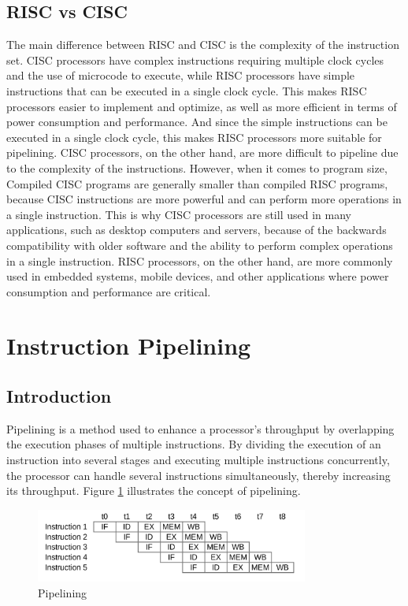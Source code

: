 \subsection{RISC vs CISC}
The main difference between RISC and CISC is the complexity of the instruction set. CISC processors have complex instructions requiring multiple clock cycles and the use of microcode to execute, while RISC processors have simple instructions that can be executed in a single clock cycle\cite{jamil1995risc}. This makes RISC processors easier to implement and optimize, as well as more efficient in terms of power consumption and performance. And since the simple instructions can be executed in a single clock cycle, this makes RISC processors more suitable for pipelining. CISC processors, on the other hand, are more difficult to pipeline due to the complexity of the instructions. However, when it comes to program size, Compiled CISC programs are generally smaller than compiled RISC programs, because CISC instructions are more powerful and can perform more operations in a single instruction\cite{jamil1995risc}. This is why CISC processors are still used in many applications, such as desktop computers and servers, because of the backwards compatibility with older software and the ability to perform complex operations in a single instruction. RISC processors, on the other hand, are more commonly used in embedded systems, mobile devices, and other applications where power consumption and performance are critical\cite{ryzhyk2006arm}.

\section {Instruction Pipelining}\label{sec:pipelining}

\subsection {Introduction}\label{sec:pipelining_intro}
Pipelining is a method used to enhance a processor's throughput by overlapping the execution phases of multiple instructions. By dividing the execution of an instruction into several stages and executing multiple instructions concurrently, the processor can handle several instructions simultaneously, thereby increasing its throughput\cite{olanrewaju2017design}. Figure \ref{fig:pipeline} illustrates the concept of pipelining.

\begin{figure}[H]
    \centering
    \includegraphics[width=0.8\textwidth]{assets/images/pipeline.png}
    \caption{Pipelining} 
    \label{fig:pipeline} 
\end{figure}

